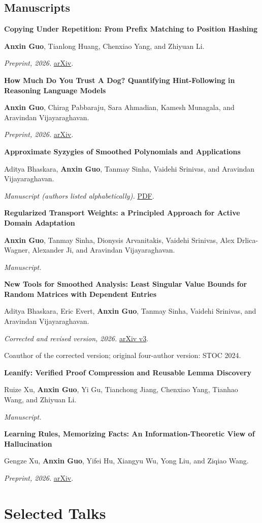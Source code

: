 \documentclass[11pt,letterpaper]{article}
\newcommand{\paperentry}[4]{%
  \Needspace{4\baselineskip}
  \textbf{#1}\par
  #2\par
  \emph{#3}#4\par
}
\newcommand{\papersep}{\vspace{0.72em}}
\begin{document}
\subsection*{Manuscripts}

\paperentry
{Copying Under Repetition: From Prefix Matching to Position Hashing}
{\textbf{Anxin Guo}, Tianlong Huang, Chenxiao Yang, and Zhiyuan Li.}
{Preprint, 2026.}
{ \href{https://arxiv.org/abs/2610.26722}{arXiv}.}
\papersep

\paperentry
{How Much Do You Trust A Dog? Quantifying Hint-Following in Reasoning Language Models}
{\textbf{Anxin Guo}, Chirag Pabbaraju, Sara Ahmadian, Kamesh Munagala, and Aravindan Vijayaraghavan.}
{Preprint, 2026.}
{ \href{https://arxiv.org/abs/2610.32055}{arXiv}.}
\papersep

\paperentry
{Approximate Syzygies of Smoothed Polynomials and Applications}
{Aditya Bhaskara, \textbf{Anxin Guo}, Tanmay Sinha, Vaidehi Srinivas, and Aravindan Vijayaraghavan.}
{Manuscript (authors listed alphabetically).}
{ \href{https://anxin-bob-guo.org/assets/papers/approximate-syzygies.pdf}{PDF}.}
\papersep

\paperentry
{Regularized Transport Weights: a Principled Approach for Active Domain Adaptation}
{\textbf{Anxin Guo}, Tanmay Sinha, Dionysis Arvanitakis, Vaidehi Srinivas, Alex Drlica-Wagner, Alexander Ji, and Aravindan Vijayaraghavan.}
{Manuscript.}
{}
\papersep

\paperentry
{New Tools for Smoothed Analysis: Least Singular Value Bounds for Random Matrices with Dependent Entries}
{Aditya Bhaskara, Eric Evert, \textbf{Anxin Guo}, Tanmay Sinha, Vaidehi Srinivas, and Aravindan Vijayaraghavan.}
{Corrected and revised version, 2026.}
{ \href{https://arxiv.org/abs/2405.01517v3}{arXiv v3}.}
{\small Coauthor of the corrected version; original four-author version: STOC 2024.\par}
\papersep

\paperentry
{Leanify: Verified Proof Compression and Reusable Lemma Discovery}
{Ruize Xu, \textbf{Anxin Guo}, Yi Gu, Tianchong Jiang, Chenxiao Yang, Tianhao Wang, and Zhiyuan Li.}
{Manuscript.}
{}
\papersep

\paperentry
{Learning Rules, Memorizing Facts: An Information-Theoretic View of Hallucination}
{Gengze Xu, \textbf{Anxin Guo}, Yifei Hu, Xiangyu Wu, Yong Liu, and Ziqiao Wang.}
{Preprint, 2026.}
{ \href{https://arxiv.org/abs/2610.16233}{arXiv}.}

\section{Selected Talks}
\end{document}
